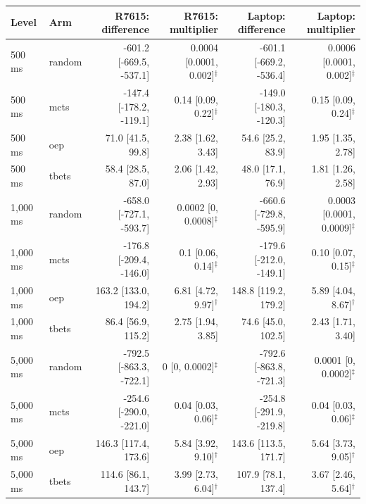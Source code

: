 \begin{tabular}{llrrrr}
\toprule
Level & Arm & R7615: difference & R7615: multiplier & Laptop: difference & Laptop: multiplier \\
\midrule
500 ms & random & -601.2 {[}-669.5, -537.1{]} & 0.0004 {[}0.0001, 0.002{]}$^\ddagger$ & -601.1 {[}-669.2, -536.4{]} & 0.0006 {[}0.0001, 0.002{]}$^\ddagger$ \\
500 ms & mcts & -147.4 {[}-178.2, -119.1{]} & 0.14 {[}0.09, 0.22{]}$^\ddagger$ & -149.0 {[}-180.3, -120.3{]} & 0.15 {[}0.09, 0.24{]}$^\ddagger$ \\
500 ms & oep & 71.0 {[}41.5, 99.8{]} & 2.38 {[}1.62, 3.43{]} & 54.6 {[}25.2, 83.9{]} & 1.95 {[}1.35, 2.78{]} \\
500 ms & tbets & 58.4 {[}28.5, 87.0{]} & 2.06 {[}1.42, 2.93{]} & 48.0 {[}17.1, 76.9{]} & 1.81 {[}1.26, 2.58{]} \\
1,000 ms & random & -658.0 {[}-727.1, -593.7{]} & 0.0002 {[}0, 0.0008{]}$^\ddagger$ & -660.6 {[}-729.8, -595.9{]} & 0.0003 {[}0.0001, 0.0009{]}$^\ddagger$ \\
1,000 ms & mcts & -176.8 {[}-209.4, -146.0{]} & 0.1 {[}0.06, 0.14{]}$^\ddagger$ & -179.6 {[}-212.0, -149.1{]} & 0.10 {[}0.07, 0.15{]}$^\ddagger$ \\
1,000 ms & oep & 163.2 {[}133.0, 194.2{]} & 6.81 {[}4.72, 9.97{]}$^\dagger$ & 148.8 {[}119.2, 179.2{]} & 5.89 {[}4.04, 8.67{]}$^\dagger$ \\
1,000 ms & tbets & 86.4 {[}56.9, 115.2{]} & 2.75 {[}1.94, 3.85{]} & 74.6 {[}45.0, 102.5{]} & 2.43 {[}1.71, 3.40{]} \\
5,000 ms & random & -792.5 {[}-863.3, -722.1{]} & 0 {[}0, 0.0002{]}$^\ddagger$ & -792.6 {[}-863.8, -721.3{]} & 0.0001 {[}0, 0.0002{]}$^\ddagger$ \\
5,000 ms & mcts & -254.6 {[}-290.0, -221.0{]} & 0.04 {[}0.03, 0.06{]}$^\ddagger$ & -254.8 {[}-291.9, -219.8{]} & 0.04 {[}0.03, 0.06{]}$^\ddagger$ \\
5,000 ms & oep & 146.3 {[}117.4, 173.6{]} & 5.84 {[}3.92, 9.10{]}$^\dagger$ & 143.6 {[}113.5, 171.7{]} & 5.64 {[}3.73, 9.05{]}$^\dagger$ \\
5,000 ms & tbets & 114.6 {[}86.1, 143.7{]} & 3.99 {[}2.73, 6.04{]}$^\dagger$ & 107.9 {[}78.1, 137.4{]} & 3.67 {[}2.46, 5.64{]}$^\dagger$ \\
\bottomrule
\end{tabular}
